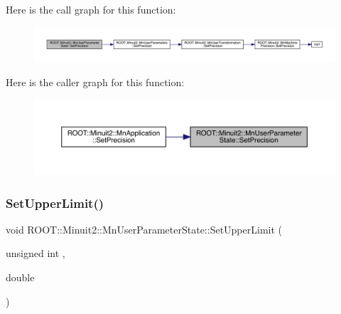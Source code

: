 Here is the call graph for this function\+:\nopagebreak
\begin{figure}[H]
\begin{center}
\leavevmode
\includegraphics[width=350pt]{d3/de0/classROOT_1_1Minuit2_1_1MnUserParameterState_aab7787768e533471839387ef51a75cbb_cgraph}
\end{center}
\end{figure}
Here is the caller graph for this function\+:\nopagebreak
\begin{figure}[H]
\begin{center}
\leavevmode
\includegraphics[width=350pt]{d3/de0/classROOT_1_1Minuit2_1_1MnUserParameterState_aab7787768e533471839387ef51a75cbb_icgraph}
\end{center}
\end{figure}
\mbox{\label{classROOT_1_1Minuit2_1_1MnUserParameterState_ab79ab45c03ce6dcf71dfc90d967955cf}} 
\subsubsection{\texorpdfstring{SetUpperLimit()}{SetUpperLimit()}\hspace{0.1cm}{\footnotesize\ttfamily [1/4]}}
{\footnotesize\ttfamily void R\+O\+O\+T\+::\+Minuit2\+::\+Mn\+User\+Parameter\+State\+::\+Set\+Upper\+Limit (\begin{DoxyParamCaption}\item[{unsigned int}]{,  }\item[{double}]{ }\end{DoxyParamCaption})}

\mbox{\label{classROOT_1_1Minuit2_1_1MnUserParameterState_ab79ab45c03ce6dcf71dfc90d967955cf}} 
